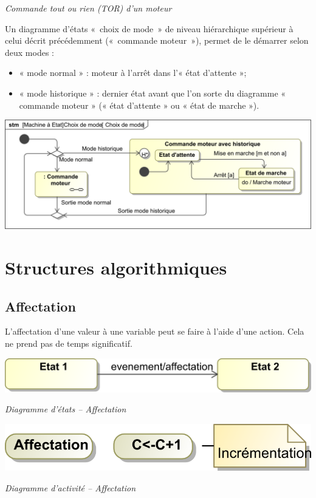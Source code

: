 \documentclass[10pt,fleqn]{article} %
\begin{document}
\begin{exemple}

\textit{Commande tout ou rien (TOR) d’un moteur}

Un diagramme d’états «~choix de mode~» de niveau hiérarchique supérieur à celui décrit précédemment («~commande moteur~»), permet de le démarrer selon deux modes :
\begin{itemize}
\item « mode normal » : moteur à l’arrêt dans l’« état d’attente »;
\item « mode historique » : dernier état avant que l’on sorte du diagramme « commande moteur » (« état d’attente » ou « état de marche »).
\end{itemize}

\begin{center}
\includegraphics[width=.8\textwidth]{images/ChoixMode}
\end{center}
\end{exemple}

\section{Structures algorithmiques}
\subsection{Affectation}
L’affectation d’une valeur à une variable peut se faire à l’aide d’une action. Cela ne prend pas
de temps significatif.

\begin{minipage}[c]{.48\linewidth}
\begin{center}
\includegraphics[width=\textwidth]{images/etat_affectation}

\textit{Diagramme d'états -- Affectation}
\end{center}
\end{minipage} \hfill
\begin{minipage}[c]{.48\linewidth}
\begin{center}
\includegraphics[width=.75\textwidth]{images/activite_affectation}

\textit{Diagramme d'activité -- Affectation}
\end{center}
\end{minipage}
\end{document}
